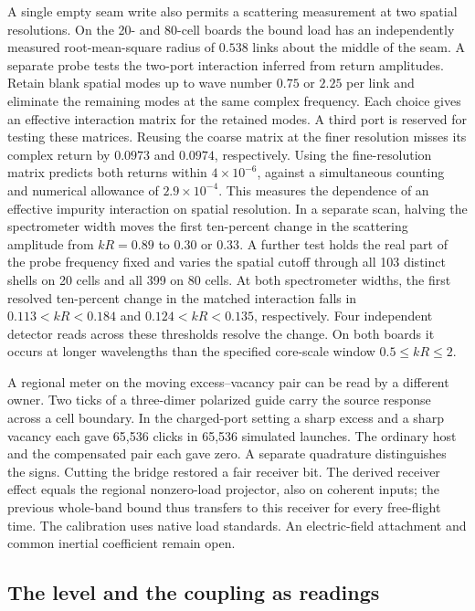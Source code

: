 \documentclass[11pt]{article}
\theoremstyle{definition}
\theoremstyle{remark}
\theoremstyle{plain}
\begin{document}
A single empty seam write also permits a scattering measurement at two
spatial resolutions. On the 20- and 80-cell boards the bound load has
an independently measured root-mean-square radius of $0.538$ links
about the middle of the seam. A separate probe tests the two-port
interaction inferred from return amplitudes. Retain blank spatial
modes up to wave number $0.75$ or $2.25$ per link and eliminate the
remaining modes at the same complex frequency. Each choice gives an
effective interaction matrix for the retained modes. A third port is
reserved for testing these matrices. Reusing the coarse matrix at the
finer resolution misses its complex return by $0.0973$ and $0.0974$,
respectively. Using the fine-resolution matrix predicts both returns
within $4\times10^{-6}$, against a simultaneous counting and numerical
allowance of $2.9\times10^{-4}$. This measures the dependence of an
effective impurity interaction on spatial resolution. In a separate
scan, halving the spectrometer width moves the first ten-percent change
in the scattering amplitude from $kR=0.89$ to $0.30$ or $0.33$.
A further test holds the real part of the probe frequency fixed and
varies the spatial cutoff through all 103 distinct shells on 20 cells
and all 399 on 80 cells. At both spectrometer widths, the first
resolved ten-percent change in the matched interaction falls in
$0.113 < kR < 0.184$ and $0.124 < kR < 0.135$, respectively.
Four independent detector reads across these thresholds resolve the
change. On both boards it occurs at longer wavelengths than the
specified core-scale window $0.5\le kR\le 2$.

A regional meter on the moving excess--vacancy pair can be read by a
different owner. Two ticks of a three-dimer polarized guide carry the
source response across a cell boundary. In the charged-port setting a
sharp excess and a sharp vacancy each gave 65,536 clicks in 65,536
simulated launches. The ordinary host and the compensated pair each gave
zero. A separate quadrature distinguishes the signs. Cutting the bridge
restored a fair receiver bit. The derived receiver effect equals the
regional nonzero-load projector, also on coherent inputs; the previous
whole-band bound thus transfers to this receiver for every free-flight
time. The calibration uses native load standards. An electric-field
attachment and common inertial coefficient remain open.

\subsection{The level and the coupling as readings}
\end{document}
